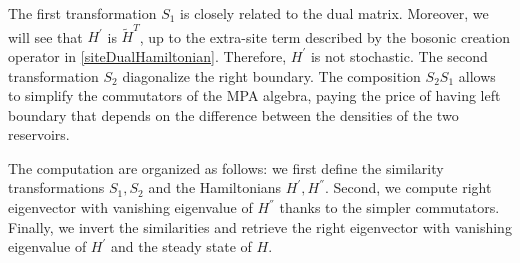 \documentclass[11pt]{article}
\numberwithin{equation}{section}
\numberwithin{equation}{subsection}
\newcommand{\com}[1]{{ (* {\color{red}\small #1}*)}}
\begin{document}
The first transformation $S_{1}$ is closely related to the dual matrix. Moreover, we will see that $H^{'}$ is $\widetilde{H}^{T}$, up to the extra-site term described by the bosonic creation operator in \eqref{siteDualHamiltonian}. Therefore, $H^{'}$ is not stochastic. The second transformation $S_{2}$ diagonalize the right boundary. The composition  $S_{2} S_{1}$ allows to simplify the commutators of the MPA algebra, paying the price of having left boundary that depends on the difference between the densities of the two reservoirs. 

The computation are organized as follows: we first define the similarity transformations $S_{1},S_{2}$ and the Hamiltonians $H^{'},H^{''}$. Second, we compute right eigenvector with vanishing eigenvalue of $H^{''}$ thanks to the simpler commutators. Finally, we invert the similarities and retrieve the right eigenvector with vanishing eigenvalue of $H^{'}$ and the steady state of $H$.  

\end{document}
